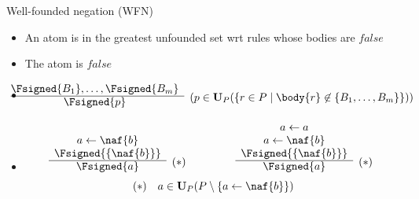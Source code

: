 \begin{frame}{Well-founded negation (WFN)}
\begin{itemize}
\item {} An atom is in the greatest unfounded set wrt rules whose bodies are $\mathit{false}$
\item {} The atom is $\mathit{false}$
\item {}
\[
\hspace{-5mm}
\begin{array}{@{}cl}
\Fsigned{B_1},\dots,\Fsigned{B_m} &
\raisebox{-8pt}[0pt][0pt]{($p \in \mathbf{U}_P(\{r \in P \mid \body{r} \not\in \{B_1,\dots,B_m\}\})$)}
\\\cline{1-1}
\Fsigned{p}
\end{array}
\]
\item<2-> 
\[
\begin{array}[b]{cl}
a \leftarrow \naf{b} \\
\Fsigned{\{\naf{b}\}} &
\raisebox{-8pt}[0pt][0pt]{$(*)$}
\\\cline{1-1}
\Fsigned{a}
\end{array}
\qquad\qquad
\begin{array}[b]{cl}
a \leftarrow a \\
a \leftarrow \naf{b} \\
\Fsigned{\{\naf{b}\}} &
\raisebox{-8pt}[0pt][0pt]{$(*)$}
\\\cline{1-1}
\Fsigned{a}
\end{array}
\hfill
\]
\[
\hfill
(*)\quad a \in \mathbf{U}_P(P \setminus \{a \leftarrow \naf{b}\})
\hfill\hfill
\]
\end{itemize}
\end{frame}
